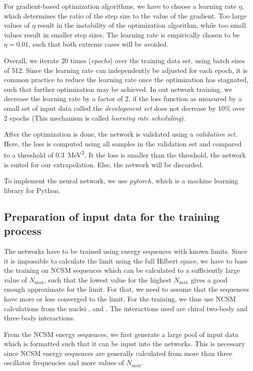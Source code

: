 For gradient-based optimization algorithms, we have to choose a learning rate $\eta$, which determines the ratio of the step size to the value of the gradient. Too large values of $\eta$ result in the instability of the optimization algorithm, while too small values result in smaller step sizes. The learning rate is empirically chosen to be $\eta = 0.01$, such that both extreme cases will be avoided.

Overall, we iterate 20 times (\textit{epochs}) over the training data set, using batch sizes of 512. Since the learning rate can independently be adjusted for each epoch, it is common practice to reduce the learning rate once the optimization has stagnated, such that further optimization may be achieved. In out network training, we decrease the learning rate by a factor of 2, if the loss function as measured by a small set of input data called the \textit{development set} does not decrease by 10\% over 2 epochs (This mechanism is called \textit{learning rate scheduling}).

After the optimization is done, the network is validated using a \textit{validation set}. Here, the loss is computed using all samples in the validation set and compared to a threshold of \SI{0.3}{\mega\electronvolt\squared}. It the loss is smaller than the threshold, the network is suited for our extrapolation. Else, the network will be discarded.

To implement the neural network, we use \textit{pytorch}, which is a machine learning library for Python.

\subsection{Preparation of input data for the training process}
The networks have to be trained using energy sequences with known limits. Since it is impossible to calculate the limit using the full Hilbert space, we have to base the training on NCSM sequences which can be calculated to a sufficiently large value of $N_\mathrm{max}$, such that the lowest value for the highest $N_\mathrm{max}$ gives a good enough approximate for the limit. For that, we need to assume that the sequences have more or less converged to the limit. For the training, we thus use NCSM calculations from the nuclei ,  and . The interactions used are chiral two-body and three-body interactions.

From the NCSM energy sequences, we first generate a large pool of input data which is formatted such that it can be input into the networks. This is necessary since NCSM energy sequences are generally calculated from more than three oscillator frequencies and more values of $N_\mathrm{max}$.


